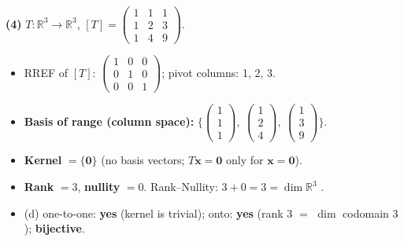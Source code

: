 \noindent\textbf{(4)} $T:\mathbb{R}^3\to\mathbb{R}^3$, $[T]=\begin{pmatrix}1 & 1 & 1 \\ 1 & 2 & 3 \\ 1 & 4 & 9\end{pmatrix}$.
\begin{itemize}
\item RREF of $[T]$: $\begin{pmatrix}1 & 0 & 0 \\ 0 & 1 & 0 \\ 0 & 0 & 1\end{pmatrix}$; pivot columns: 1, 2, 3.
\item \textbf{Basis of range (column space):} $\Big\{\begin{pmatrix}1 \\ 1 \\ 1\end{pmatrix},\ \begin{pmatrix}1 \\ 2 \\ 4\end{pmatrix},\ \begin{pmatrix}1 \\ 3 \\ 9\end{pmatrix}\Big\}$.
\item \textbf{Kernel} $=\{\mathbf 0\}$ (no basis vectors; $T\mathbf x=\mathbf0$ only for $\mathbf x=\mathbf 0$).
\item \textbf{Rank} $=3$, \textbf{nullity} $=0$. Rank--Nullity: $3+0=3=\dim\mathbb{R}^3$ \checkmark.
\item (d) one-to-one: \textbf{yes} (kernel is trivial); onto: \textbf{yes} (rank $3$ $=$ $\dim$ codomain $3$); \textbf{bijective}.
\end{itemize}

